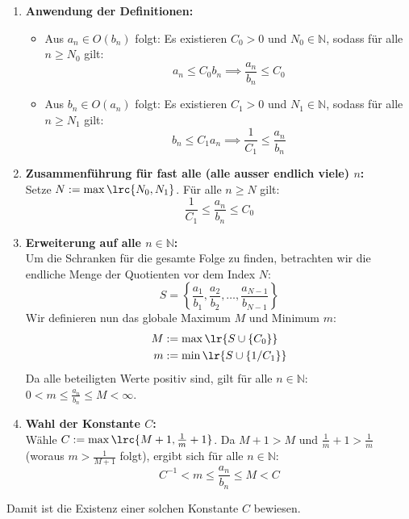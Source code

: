 \begin{questions}
\begin{parts}
\begin{solution}
\begin{enumerate}
    \item \textbf{Anwendung der Definitionen:}
    \begin{itemize}
        \item Aus $a_n \in O(b_n)$ folgt: Es existieren $C_0 > 0$ und $N_0 \in \mathbb{N}$, sodass für alle $n \geq N_0$ gilt:
        \begin{equation} a_n \leq C_0 b_n \implies \frac{a_n}{b_n} \leq C_0 \end{equation}
        \item Aus $b_n \in O(a_n)$ folgt: Es existieren $C_1 > 0$ und $N_1 \in \mathbb{N}$, sodass für alle $n \geq N_1$ gilt:
        \begin{equation} b_n \leq C_1 a_n \implies \frac{1}{C_1} \leq \frac{a_n}{b_n} \end{equation}
    \end{itemize}

    \item \textbf{Zusammenführung für fast alle (alle ausser endlich viele) $n$:}\\
    Setze $N := \max\lrc{N_0, N_1}$. Für alle $n \geq N$ gilt:
    \begin{equation} \frac{1}{C_1} \leq \frac{a_n}{b_n} \leq C_0 \end{equation}

    \item \textbf{Erweiterung auf alle $n \in \mathbb{N}$:}\\
    Um die Schranken für die gesamte Folge zu finden, betrachten wir die endliche Menge der Quotienten vor dem Index $N$:
    \[ S = \left\{ \frac{a_1}{b_1}, \frac{a_2}{b_2}, \dots, \frac{a_{N-1}}{b_{N-1}} \right\} \]
    Wir definieren nun das globale Maximum $M$ und Minimum $m$:
    \begin{align*}
        M &:= \max\lr{S \cup \{C_0\}} \\
        m &:= \min\lr{S \cup \{1/C_1\}}
    \end{align*}
    Da alle beteiligten Werte positiv sind, gilt für alle $n \in \mathbb{N}$: $0 < m \leq \frac{a_n}{b_n} \leq M < \infty$.

    \item \textbf{Wahl der Konstante $C$:}\\
    Wähle $C := \max\lrc{ M + 1, \frac{1}{m} + 1}$. Da $M+1 > M$ und $\frac{1}{m}+1 > \frac{1}{m}$ (woraus $m > \frac{1}{M+1}$ folgt), ergibt sich für alle $n \in \mathbb{N}$:
    \[ C^{-1} < m \leq \frac{a_n}{b_n} \leq M < C \]
\end{enumerate}
Damit ist die Existenz einer solchen Konstante $C$ bewiesen.
		\end{solution}
		\droptotalpoints
	\end{parts}


\end{questions}
